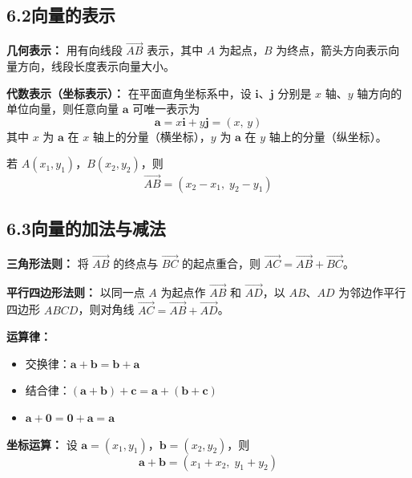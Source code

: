 \documentclass[12pt, a4paper]{ctexart}
\begin{document}
\subsection*{6.2\quad 向量的表示}

\begin{knowledgebox}[向量的几何表示与代数表示]
\textbf{几何表示：} 用有向线段 $\overrightarrow{AB}$ 表示，其中 $A$ 为起点，$B$ 为终点，箭头方向表示向量方向，线段长度表示向量大小。

\textbf{代数表示（坐标表示）：} 在平面直角坐标系中，设 $\boldsymbol{i}$、$\boldsymbol{j}$ 分别是 $x$ 轴、$y$ 轴方向的单位向量，则任意向量 $\boldsymbol{a}$ 可唯一表示为
\[
\boldsymbol{a} = x\boldsymbol{i} + y\boldsymbol{j} = (x,\, y)
\]
其中 $x$ 为 $\boldsymbol{a}$ 在 $x$ 轴上的分量（横坐标），$y$ 为 $\boldsymbol{a}$ 在 $y$ 轴上的分量（纵坐标）。

若 $A(x_1,y_1)$，$B(x_2,y_2)$，则
\[
\overrightarrow{AB} = (x_2 - x_1,\; y_2 - y_1)
\]
\end{knowledgebox}

\subsection*{6.3\quad 向量的加法与减法}

\begin{knowledgebox}[向量加法]
\textbf{三角形法则：} 将 $\overrightarrow{AB}$ 的终点与 $\overrightarrow{BC}$ 的起点重合，则 $\overrightarrow{AC}=\overrightarrow{AB}+\overrightarrow{BC}$。

\textbf{平行四边形法则：} 以同一点 $A$ 为起点作 $\overrightarrow{AB}$ 和 $\overrightarrow{AD}$，以 $AB$、$AD$ 为邻边作平行四边形 $ABCD$，则对角线 $\overrightarrow{AC}=\overrightarrow{AB}+\overrightarrow{AD}$。

\textbf{运算律：}
\begin{itemize}[leftmargin=2em]
  \item 交换律：$\boldsymbol{a}+\boldsymbol{b}=\boldsymbol{b}+\boldsymbol{a}$
  \item 结合律：$(\boldsymbol{a}+\boldsymbol{b})+\boldsymbol{c}=\boldsymbol{a}+(\boldsymbol{b}+\boldsymbol{c})$
  \item $\boldsymbol{a}+\boldsymbol{0}=\boldsymbol{0}+\boldsymbol{a}=\boldsymbol{a}$
\end{itemize}

\textbf{坐标运算：} 设 $\boldsymbol{a}=(x_1,y_1)$，$\boldsymbol{b}=(x_2,y_2)$，则
\[
\boldsymbol{a}+\boldsymbol{b}=(x_1+x_2,\; y_1+y_2)
\]
\end{knowledgebox}
\end{document}
